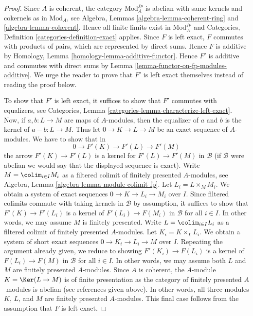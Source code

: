 \begin{proof}
Since $A$ is coherent, the category $\text{Mod}^{fp}_A$ is abelian
with same kernels and cokernels as in $\text{Mod}_A$, see
Algebra, Lemmas \ref{algebra-lemma-coherent-ring} and
\ref{algebra-lemma-coherent}. Hence all finite limits exist in
$\text{Mod}^{fp}_A$ and
Categories, Definition \ref{categories-definition-exact} applies.
Since $F$ is left exact, $F$ commutes with products of pairs, which are
represented by direct sums. Hence $F$ is additive by
Homology, Lemma \ref{homology-lemma-additive-functor}.
Hence $F'$ is additive and commutes with direct sums by
Lemma \ref{lemma-functor-on-fp-modules-additive}.
We urge the reader to prove that $F'$ is left exact themselves
instead of reading the proof below.

\medskip\noindent
To show that $F'$ is left exact, it suffices to show that $F'$ commutes
with equalizers, see
Categories, Lemma \ref{categories-lemma-characterize-left-exact}.
Now, if $a, b : L \to M$ are maps of $A$-modules, then the
equalizer of $a$ and $b$ is the kernel of $a - b : L \to M$.
Thus let $0 \to K \to L \to M$ be an exact sequence
of $A$-modules. We have to show that in
$$
0 \to F'(K) \to F'(L) \to F'(M)
$$
the arrow $F'(K) \to F'(L)$ is a kernel for $F'(L) \to F'(M)$ in $\mathcal{B}$
(if $\mathcal{B}$ were abelian we would say that the displayed sequence
is exact).
Write $M = \colim_{i \in I} M_i$ as a filtered colimit of finitely
presented $A$-modules, see
Algebra, Lemma \ref{algebra-lemma-module-colimit-fp}.
Let $L_i = L \times_M M_i$. 
We obtain a system of exact sequences $0 \to K \to L_i \to M_i$
over $I$. Since filtered colimits commute with taking kernels
in $\mathcal{B}$ by assumption, 
it suffices to show that $F'(K) \to F'(L_i)$ is a kernel of
$F'(L_i) \to F(M_i)$ in $\mathcal{B}$ for all $i \in I$. In other words, we may
assume $M$ is finitely presented. Write $L = \colim_{i \in I} L_i$
as a filtered colimit of finitely presented $A$-modules.
Let $K_i = K \times_L L_i$. We obtain a system of short exact sequences
$0 \to K_i \to L_i \to M$ over $I$.
Repeating the argument already given, we reduce to showing
$F'(K_i) \to F(L_i)$ is a kernel of
$F(L_i) \to F(M)$ in $\mathcal{B}$ for all $i \in I$.
In other words, we may assume both
$L$ and $M$ are finitely presented $A$-modules.
Since $A$ is coherent, the $A$-module $K = \Ker(L \to M)$ is
of finite presentation as the category of finitely presented
$A$-modules is abelian (see references given above).
In other words, all three modules $K$, $L$, and $M$
are finitely presented $A$-modules. This final case follows
from the assumption that $F$ is left exact.
\end{proof}

